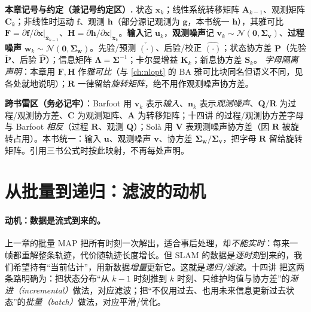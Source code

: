 \begin{note}
\textbf{本章记号与约定（兼记号约定区）.}\;
状态 $\mathbf{x}_k$；线性系统转移矩阵 $\mathbf{A}_{k-1}$、观测矩阵 $\mathbf{C}_k$；非线性时运动 $\mathbf{f}$、观测 $\mathbf{h}$（部分源记观测为 $\mathbf{g}$，本书统一 $\mathbf{h}$），其雅可比 $\mathbf{F}=\partial\mathbf{f}/\partial\mathbf{x}|_{\hat{\mathbf{x}}_{k-1}}$、$\mathbf{H}=\partial\mathbf{h}/\partial\mathbf{x}|_{\check{\mathbf{x}}_k}$。\textbf{输入}记 $\mathbf{u}_k$，\textbf{观测噪声}记 $\mathbf{v}_k\sim\mathcal{N}(\mathbf{0},\boldsymbol{\Sigma}_{\mathbf{v}})$、\textbf{过程噪声} $\mathbf{w}_k\sim\mathcal{N}(\mathbf{0},\boldsymbol{\Sigma}_{\mathbf{w}})$。先验/预测 $\check{(\cdot)}$、后验/校正 $\hat{(\cdot)}$；状态协方差 $\mathbf{P}$（先验 $\check{\mathbf{P}}$、后验 $\hat{\mathbf{P}}$）；信息矩阵 $\boldsymbol{\Lambda}=\boldsymbol{\Sigma}^{-1}$；卡尔曼增益 $\mathbf{K}_k$；新息协方差 $\mathbf{S}_k$。
\emph{字母隔离声明}：本章用 $\mathbf{F},\mathbf{H}$ 作\emph{雅可比}（与 \cref{ch:nlopt} 的 BA 雅可比块同名但语义不同，见各处就地说明）；$\mathbf{R}$ 一律留给\emph{旋转矩阵}，绝不用作观测噪声协方差。

\textbf{跨书雷区（务必记牢）}：Barfoot\cite{barfoot2024state} 用 $\mathbf{v}_k$ 表示\emph{输入}、$\mathbf{n}_k$ 表示\emph{观测噪声}、$\mathbf{Q}/\mathbf{R}$ 为过程/观测协方差、$\mathbf{C}$ 为观测矩阵、$\mathbf{A}$ 为转移矩阵；十四讲\cite{gaoxiang2019slam14} 的过程/观测协方差字母与 Barfoot \emph{相反}（过程 $\mathbf{R}$、观测 $\mathbf{Q}$）；Solà\cite{sola2017quaternion} 用 $\mathbf{V}$ 表观测噪声协方差（因 $\mathbf{R}$ 被旋转占用）。本书统一：输入 $\mathbf{u}$、观测噪声 $\mathbf{v}$、协方差 $\boldsymbol{\Sigma}_{\mathbf{w}}/\boldsymbol{\Sigma}_{\mathbf{v}}$，把字母 $\mathbf{R}$ 留给旋转矩阵。引用三书公式时按此映射，不再每处声明。
\end{note}

\section{从批量到递归：滤波的动机}
\label{sec:eskf-why}

\paragraph{动机：数据是流式到来的。}
上一章的批量 MAP 把所有时刻一次解出，适合事后处理，却\emph{不能实时}：每来一帧都重解整条轨迹，代价随轨迹长度增长。但 SLAM 的数据是\emph{逐时刻}到来的，我们希望持有“当前估计”，用新数据\emph{增量}更新它。这就是\emph{递归/滤波}。十四讲\cite{gaoxiang2019slam14} 把这两条路明确为：把状态分布“从 $k-1$ 时刻推到 $k$ 时刻、只维护均值与协方差”的\emph{渐进（incremental）}做法，对应滤波；把“不仅用过去、也用未来信息更新过去状态”的\emph{批量（batch）}做法，对应平滑/优化。

